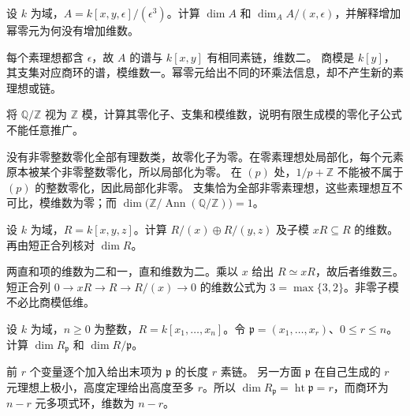 \begin{exercise}\label{b3:ex:09-reduced-dimension}
	设 \(k\) 为域，\(A=k[x,y,\epsilon]/(\epsilon^3)\)。计算 \(\dim A\) 和 \(\dim_A A/(x,\epsilon)\)，并解释增加幂零元为何没有增加维数。
\end{exercise}
\begin{solution}
	每个素理想都含 \(\epsilon\)，故 \(A\) 的谱与 \(k[x,y]\) 有相同素链，维数二。 商模是 \(k[y]\)，其支集对应商环的谱，模维数一。幂零元给出不同的环乘法信息，却不产生新的素理想或链。
\end{solution}

\begin{exercise}\label{b3:ex:09-nonfinite-support}
	将 \(\mathbb Q/\mathbb Z\) 视为 \(\mathbb Z\) 模，计算其零化子、支集和模维数，说明有限生成模的零化子公式不能任意推广。
\end{exercise}
\begin{solution}
	没有非零整数零化全部有理数类，故零化子为零。在零素理想处局部化，每个元素原本被某个非零整数零化，所以局部化为零。 在 \((p)\) 处，\(1/p+\mathbb Z\) 不能被不属于 \((p)\) 的整数零化，因此局部化非零。 支集恰为全部非零素理想，这些素理想互不可比，模维数为零；而 \(\dim\bigl(\mathbb Z/\operatorname{Ann}(\mathbb Q/\mathbb Z)\bigr)=1\)。
\end{solution}

\begin{exercise}\label{b3:ex:09-support-sum}
	设 \(k\) 为域，\(R=k[x,y,z]\)。计算 \(R/(x)\oplus R/(y,z)\) 及子模 \(xR\subseteq R\) 的维数。再由短正合列核对 \(\dim R\)。
\end{exercise}
\begin{solution}
	两直和项的维数为二和一，直和维数为二。乘以 \(x\) 给出 \(R\simeq xR\)，故后者维数三。 短正合列 \(0\rightarrow xR\rightarrow R\rightarrow R/(x)\rightarrow0\) 的维数公式为 \(3=\max\{3,2\}\)。非零子模不必比商模低维。
\end{solution}

\begin{exercise}\label{b3:ex:09-local-coordinate-height}
	设 \(k\) 为域，\(n\ge0\) 为整数，\(R=k[x_1,\ldots,x_n]\)。令 \(\mathfrak p=(x_1,\ldots,x_r)\)、\(0\le r\le n\)。 计算 \(\dim R_{\mathfrak p}\) 和 \(\dim R/\mathfrak p\)。
\end{exercise}
\begin{solution}
	前 \(r\) 个变量逐个加入给出末项为 \(\mathfrak p\) 的长度 \(r\) 素链。 另一方面 \(\mathfrak p\) 在自己生成的 \(r\) 元理想上极小，高度定理给出高度至多 \(r\)。所以 \(\dim R_{\mathfrak p}=\operatorname{ht}\mathfrak p=r\)，而商环为 \(n-r\) 元多项式环，维数为 \(n-r\)。
\end{solution}

